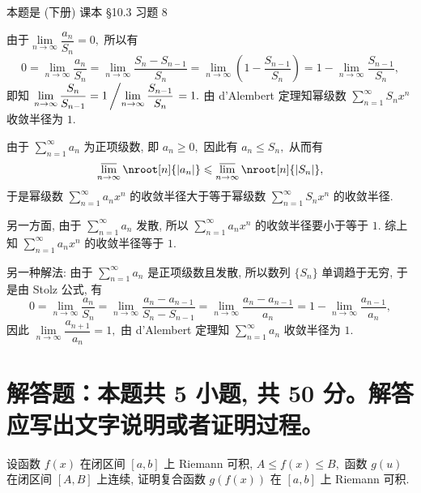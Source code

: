 \begin{solution}
本题是 (下册) 课本 \S 10.3 习题 8

由于$\lim\limits_{n\to\infty} \dfrac{a_n}{S_n} = 0,$ 所以有
$$0 = \lim\limits_{n\to\infty} \dfrac{a_n}{S_n} = \lim\limits_{n\to\infty} \dfrac{S_n - S_{n-1}}{S_n} = \lim\limits_{n\to\infty} \left( 1 - \dfrac{S_{n-1}}{S_n} \right) = 1 - \lim\limits_{n\to\infty} \dfrac{S_{n-1}}{S_n},$$
即知 $\lim\limits_{n\to\infty} \dfrac{S_n}{S_{n-1}} = 1 \left/ \lim\limits_{n\to\infty} \dfrac{S_{n-1}}{S_n} \right. = 1.$ 由 d'Alembert 定理知幂级数 $\sum\limits_{n=1}^{\infty} S_n x^n$ 收敛半径为 $1.$

由于 $\sum\limits_{n=1}^{\infty} a_n$ 为正项级数, 即 $a_n \geqslant 0,$ 因此有 $a_n \leqslant S_n,$ 从而有
$$\varlimsup_{n\to\infty} \nroot[n]{\lvert a_n \rvert} \leqslant \varlimsup_{n\to\infty} \nroot[n]{\lvert S_n \rvert},$$
于是幂级数 $\sum\limits_{n=1}^{\infty} a_n x^n$ 的收敛半径大于等于幂级数 $\sum\limits_{n=1}^{\infty} S_n x^n$ 的收敛半径.

另一方面, 由于 $\sum\limits_{n=1}^{\infty} a_n$ 发散, 所以 $\sum\limits_{n=1}^{\infty} a_n x^n$ 的收敛半径要小于等于 $1.$ 综上知 $\sum\limits_{n=1}^{\infty} a_n x^n$ 的收敛半径等于 $1.$

另一种解法: 由于 $\sum\limits_{n=1}^{\infty} a_n$ 是正项级数且发散, 所以数列 $\{S_n\}$ 单调趋于无穷, 于是由 Stolz 公式, 有
$$0 = \lim\limits_{n\to\infty} \dfrac{a_n}{S_n} = \lim\limits_{n\to\infty} \dfrac{a_n-a_{n-1}}{S_n-S_{n-1}} = \lim\limits_{n\to\infty} \dfrac{a_n-a_{n-1}}{a_n} = 1 -\lim\limits_{n\to\infty} \dfrac{a_{n-1}}{a_n},$$
因此 $\lim\limits_{n\to\infty} \dfrac{a_{n+1}}{a_n} = 1,$ 由 d'Alembert 定理知 $\sum\limits_{n=1}^{\infty} a_n$ 收敛半径为 $1.$
\end{solution}


\section{解答题：本题共 5 小题, 共 50 分。解答应写出文字说明或者证明过程。}


\begin{question}[points = 8]
设函数 $f(x)$ 在闭区间 $[a, b]$ 上 Riemann 可积, $A \leqslant f(x) \leqslant B,$ 函数 $g(u)$ 在闭区间 $[A, B]$ 上连续, 证明复合函数 $g(f(x))$ 在 $[a, b]$ 上 Riemann 可积.

\end{question}

